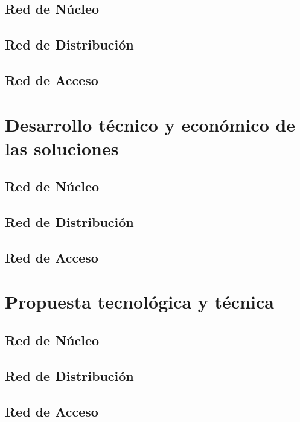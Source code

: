\documentclass[10pt,a4paper]{report}
\begin{document}
\section{Red de Núcleo}

\section{Red de Distribución}

\section{Red de Acceso}

\chapter{Desarrollo técnico y económico de las soluciones}

\section{Red de Núcleo}

\section{Red de Distribución}

\section{Red de Acceso}
\chapter{Propuesta tecnológica y técnica}

\section{Red de Núcleo}

\section{Red de Distribución}

\section{Red de Acceso}
\end{document}
